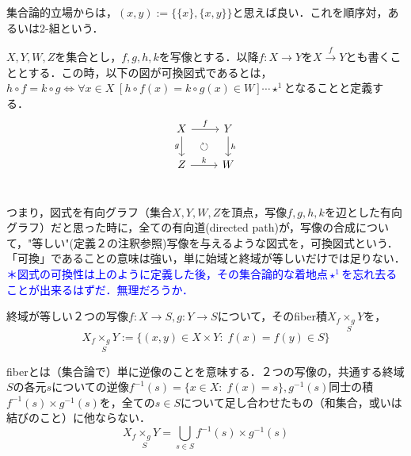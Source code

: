 \documentclass[uplatex, 12pt, a4paper, dvipdfmx]{jsarticle}
\begin{document}
集合論的立場からは，$(x,y):=\{\{x\},\{x,y\}\}$と思えば良い．これを順序対，あるいは2-組という．
\begin{shadebox}\begin{definition}[写像の可換図式]$X,Y,W,Z$を集合とし，$f,g,h,k$を写像とする．以降$f:X\longrightarrow Y$を$X\xrightarrow{f}Y$とも書くこととする．この時，以下の図が可換図式であるとは，$h\circ f=k\circ g \Longleftrightarrow \forall x\in X \; [h\circ f(x)=k\circ g(x) \in W]\cdots\star^1$となることと定義する．
    $$ \begin{tikzcd}
        X \arrow[r, "f"] \arrow[d, "g"'] \arrow[dr, phantom, "\circlearrowright"] &  Y \arrow[d, "h"] \\
            Z \arrow[r, "k"] &    W \\
    \end{tikzcd} $$
\end{definition}\end{shadebox}
つまり，図式を有向グラフ（集合$X,Y,W,Z$を頂点，写像$f,g,h,k$を辺とした有向グラフ）だと思った時に，全ての有向道(directed path)が，写像の合成について，"等しい"(定義２の注釈参照)写像を与えるような図式を，可換図式という．「可換」であることの意味は強い，単に始域と終域が等しいだけでは足りない．\\
\textcolor{blue}{＊図式の可換性は上のように定義した後，その集合論的な着地点$\star^1$を忘れ去ることが出来るはずだ．無理だろうか．}
\begin{shadebox}\begin{definition}[fiber積]終域が等しい２つの写像$f:X\longrightarrow S, g:Y\longrightarrow S$について，その\rm{fiber積}$X_f\underset{S}{\times_g}Y$を，$$X_f\underset{S}{\times_g}Y:=\{ (x,y)\in X\times Y:\; f(x)=f(y)\in S \}$$  \end{definition}\end{shadebox}
fiberとは（集合論で）単に逆像のことを意味する．２つの写像の，共通する終域$S$の各元$s$についての逆像$f^{-1}(s)=\{ x\in X:\; f(x)=s \},g^{-1}(s)$同士の積$f^{-1}(s)\times g^{-1}(s)$を，全ての$s\in S$について足し合わせたもの（和集合，或いは結びのこと）に他ならない．$$X_f\underset{S}{\times_g}Y=\bigcup_{s\in S}f^{-1}(s)\times g^{-1}(s)$$

\clearpage
\end{document}
